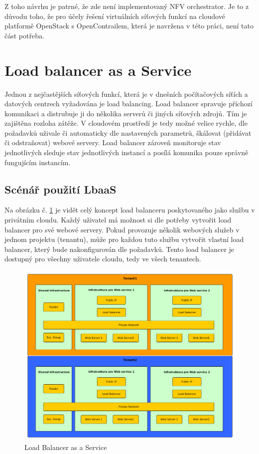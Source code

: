 Z toho návrhu je patrné, že zde není implementovaný NFV orchestrator. Je to z důvodu toho, že pro účely řešení virtuálních síťových funkcí na cloudové platformě OpenStack s OpenContrailem, která je navržena v této práci, není tato část potřeba. 

\section{Load balancer as a Service}

Jednou z nejčastějších síťových funkcí, která je v dnešních počítačových síťích a datových centrech vyžadována je load balancing. Load balancer spravuje příchozí komunikaci a distrubuje ji do několika serverů či jiných síťových zdrojů. Tím je zajištěna rozloha zátěže.  V cloudovém prostředí je tedy možné velice rychle, dle požadavků uživale či automaticky dle nastavených parametrů, škálovat (přidávat či odstraňovat) webové servery. Load balancer zároveň monitoruje stav jednotlivých sleduje stav jednotlivých instancí a posílá komunika pouze správně fungujícím instancím. 

\subsection{Scénář použití LbaaS}

Na obrázku č. \ref{fig:LoadBalancer} je vidět celý koncept load balanceru poskytovaného jako službu v privátním cloudu. Každý uživatel má možnost si dle potřeby vytvořit load balancer pro své webové servery. Pokud provozuje několik webových služeb v jednom projektu (tenantu), může pro každou tuto službu vytvořit vlastní load balancer, který bude nakonfigurován dle požadavků. Tento load balancer je dostupný pro všechny uživatele cloudu, tedy ve všech tenantech.

\begin{figure}[h]
\begin{centering}
\includegraphics[scale=0.43]{images/LoadBalancer}
\par\end{centering}
\caption{Load Balancer as a Service\label{fig:LoadBalancer}}
\end{figure}

